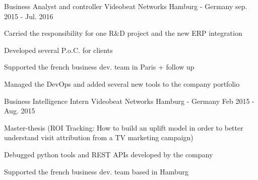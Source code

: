 

\begin{cventries}

  \cventry
    {Business Analyst and controller} %
    {Videobeat Networks} %
    {Hamburg - Germany} %
    {sep. 2015 - Jul. 2016} %
    {
      \begin{cvitems} %
        \item {Carried the responsibility for one R\&D project and the new ERP integration}
        \item {Developed several P.o.C. for clients}
        \item {Supported the french business dev. team in Paris + follow up}
        \item {Managed the DevOps and added several new tools to the company portfolio}
      \end{cvitems}
    }

  \cventry
    {Business Intelligence Intern} %
    {Videobeat Networks} %
    {Hamburg - Germany} %
    {Feb 2015 - Aug. 2015} %
    {
      \begin{cvitems} %
        \item {Master-thesis (ROI Tracking: How to build an uplift model in order to better understand visit attribution from a TV marketing campaign)}
        \item {Debugged python tools and REST APIs developed by the company}
        \item {Supported the french business dev. team based in Hamburg}
      \end{cvitems}
    }


\end{cventries}
